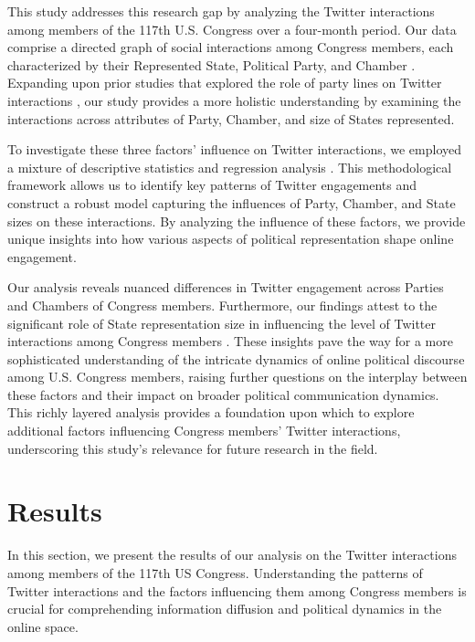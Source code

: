 \documentclass[11pt]{article}
\begin{document}
This study addresses this research gap by analyzing the Twitter interactions among members of the 117th U.S. Congress over a four-month period. Our data comprise a directed graph of social interactions among Congress members, each characterized by their Represented State, Political Party, and Chamber \cite{Theocharis2020TheDO, Hua2020CharacterizingTU, Badawy2018WhoFF, Glassman2013SocialNA}. Expanding upon prior studies that explored the role of party lines on Twitter interactions \cite{Chamberlain2021ANA, Valle2021PoliticalIB, Aragn2013CommunicationDI, Theocharis2020TheDO, Hua2020CharacterizingTU}, our study provides a more holistic understanding by examining the interactions across attributes of Party, Chamber, and size of States represented.

To investigate these three factors' influence on Twitter interactions, we employed a mixture of descriptive statistics and regression analysis \cite{Perry2018EgocentricNA, Benton2016LearningME, Himelboim2017ClassifyingTT}. This methodological framework allows us to identify key patterns of Twitter engagements and construct a robust model capturing the influences of Party, Chamber, and State sizes on these interactions. By analyzing the influence of these factors, we provide unique insights into how various aspects of political representation shape online engagement.

Our analysis reveals nuanced differences in Twitter engagement across Parties and Chambers of Congress members. Furthermore, our findings attest to the significant role of State representation size in influencing the level of Twitter interactions among Congress members \cite{Kwak2010WhatIT}. These insights pave the way for a more sophisticated understanding of the intricate dynamics of online political discourse among U.S. Congress members, raising further questions on the interplay between these factors and their impact on broader political communication dynamics. This richly layered analysis provides a foundation upon which to explore additional factors influencing Congress members' Twitter interactions, underscoring this study's relevance for future research in the field.

\section*{Results}

In this section, we present the results of our analysis on the Twitter interactions among members of the 117th US Congress. Understanding the patterns of Twitter interactions and the factors influencing them among Congress members is crucial for comprehending information diffusion and political dynamics in the online space.
\end{document}
